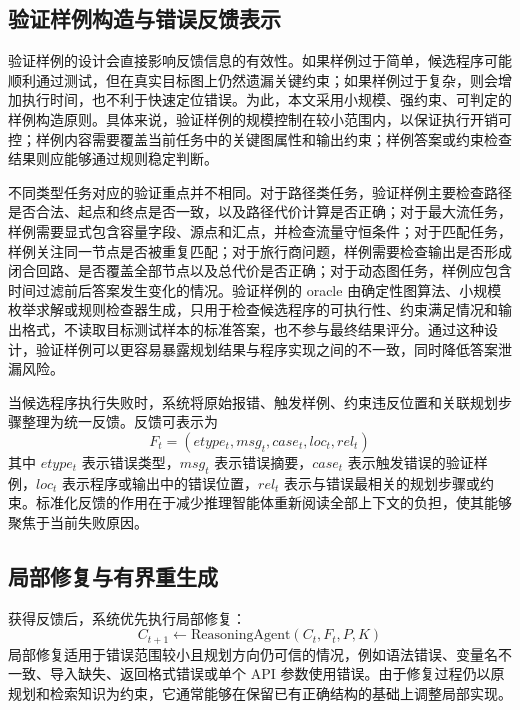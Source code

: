 \subsection{验证样例构造与错误反馈表示}

验证样例的设计会直接影响反馈信息的有效性。如果样例过于简单，候选程序可能顺利通过测试，但在真实目标图上仍然遗漏关键约束；如果样例过于复杂，则会增加执行时间，也不利于快速定位错误。为此，本文采用小规模、强约束、可判定的样例构造原则。具体来说，验证样例的规模控制在较小范围内，以保证执行开销可控；样例内容需要覆盖当前任务中的关键图属性和输出约束；样例答案或约束检查结果则应能够通过规则稳定判断。

不同类型任务对应的验证重点并不相同。对于路径类任务，验证样例主要检查路径是否合法、起点和终点是否一致，以及路径代价计算是否正确；对于最大流任务，样例需要显式包含容量字段、源点和汇点，并检查流量守恒条件；对于匹配任务，样例关注同一节点是否被重复匹配；对于旅行商问题，样例需要检查输出是否形成闭合回路、是否覆盖全部节点以及总代价是否正确；对于动态图任务，样例应包含时间过滤前后答案发生变化的情况。验证样例的 oracle 由确定性图算法、小规模枚举求解或规则检查器生成，只用于检查候选程序的可执行性、约束满足情况和输出格式，不读取目标测试样本的标准答案，也不参与最终结果评分。通过这种设计，验证样例可以更容易暴露规划结果与程序实现之间的不一致，同时降低答案泄漏风险。

当候选程序执行失败时，系统将原始报错、触发样例、约束违反位置和关联规划步骤整理为统一反馈。反馈可表示为
\begin{equation}
F_t=(etype_t,msg_t,case_t,loc_t,rel_t)
\end{equation}
其中 $etype_t$ 表示错误类型，$msg_t$ 表示错误摘要，$case_t$ 表示触发错误的验证样例，$loc_t$ 表示程序或输出中的错误位置，$rel_t$ 表示与错误最相关的规划步骤或约束。标准化反馈的作用在于减少推理智能体重新阅读全部上下文的负担，使其能够聚焦于当前失败原因。

\subsection{局部修复与有界重生成}

获得反馈后，系统优先执行局部修复：
\begin{equation}
C_{t+1}\leftarrow \mathrm{ReasoningAgent}(C_t,F_t,P,K)
\end{equation}
局部修复适用于错误范围较小且规划方向仍可信的情况，例如语法错误、变量名不一致、导入缺失、返回格式错误或单个 API 参数使用错误。由于修复过程仍以原规划和检索知识为约束，它通常能够在保留已有正确结构的基础上调整局部实现。

